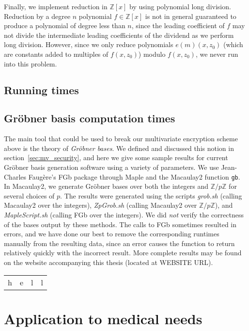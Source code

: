 \documentclass[11pt]{report}
\newcommand{\Zp}{\mathbb{Z}/p\mathbb{Z}}
\newcommand{\Zx}{\mathbb{Z}[x]}
\begin{document}
Finally, we implement reduction in $\Zx$ by using polynomial long division. Reduction by a degree $n$ polynomial $f\in\Zx$ is not in general guaranteed to produce a polynomial of degree less than $n$, since the leading coefficient of $f$ may not divide the intermediate leading coefficients of the dividend as we perform long division. However, since we only reduce polynomials $e(m)(x,z_0)$ (which are constants added to multiples of $f(x,z_0)$) modulo $f(x,z_0)$, we never run into this problem.

\subsection{Running times}


\subsection{Gr\"obner basis computation times}
The main tool that could be used to break our multivariate encryption scheme above is the theory of \emph{Gr\"obner bases}. We defined and discussed this notion in section~\ref{sec:mv_security}, and here we give some sample results for current Gr\"obner basis generation software using a variety of parameters. We use Jean-Charles Faug\`ere's FGb package through Maple and the Macaulay2 function \verb|gb|. In Macaulay2, we generate Gr\"obner bases over both the integers and $\Zp$ for several choices of $p$. The results were generated using the scripts \emph{grob.sh} (calling Macaulay2 over the integers), \emph{ZpGrob.sh} (calling Macaulay2 over $\Zp$), and \emph{MapleScript.sh} (calling FGb over the integers). We did \emph{not} verify the correctness of the bases output by these methods. The calls to FGb sometimes resulted in errors, and we have done our best to remove the corresponding runtimes manually from the resulting data, since an error causes the function to return relatively quickly with the incorrect result. More complete results may be found on the website accompanying this thesis (located at WEBSITE URL).

\begin{center}
\begin{tabular}{| l | l | l | l |}
h & e & l & l \\
\end{tabular}
\end{center}

\section{Application to medical needs}
\end{document}
